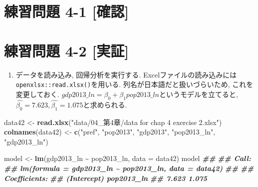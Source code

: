 \documentclass[
]{book}
\newenvironment{Shaded}{\begin{snugshade}}{\end{snugshade}}
\newcommand{\AttributeTok}[1]{\textcolor[rgb]{0.13,0.29,0.53}{#1}}
\newcommand{\DocumentationTok}[1]{\textcolor[rgb]{0.56,0.35,0.01}{\textbf{\textit{#1}}}}
\newcommand{\FunctionTok}[1]{\textcolor[rgb]{0.13,0.29,0.53}{\textbf{#1}}}
\newcommand{\NormalTok}[1]{#1}
\newcommand{\OtherTok}[1]{\textcolor[rgb]{0.56,0.35,0.01}{#1}}
\newcommand{\SpecialCharTok}[1]{\textcolor[rgb]{0.81,0.36,0.00}{\textbf{#1}}}
\newcommand{\StringTok}[1]{\textcolor[rgb]{0.31,0.60,0.02}{#1}}
\providecommand{\tightlist}{%
  \setlength{\itemsep}{0pt}\setlength{\parskip}{0pt}}
\begin{document}
\hypertarget{ux7df4ux7fd2ux554fux984c-4-1-ux78baux8a8d}{%
\section*{練習問題 4-1 {[}確認{]}}\label{ux7df4ux7fd2ux554fux984c-4-1-ux78baux8a8d}}

\hypertarget{ux7df4ux7fd2ux554fux984c-4-2-ux5b9fux8a3c}{%
\section*{練習問題 4-2 {[}実証{]}}\label{ux7df4ux7fd2ux554fux984c-4-2-ux5b9fux8a3c}}

\begin{enumerate}
\def\labelenumi{(\arabic{enumi})}
\tightlist
\item
  データを読み込み, 回帰分析を実行する.
  Excelファイルの読み込みには\texttt{openxlsx::read.xlsx()}を用いる.
  列名が日本語だと扱いづらいため, これを変更しておく.
  \(gdp2013\_ln = \beta_0 + \beta_1 pop2013\_ln\)というモデルを立てると, \(\hat{\beta_0} = 7.623, \hat{\beta_1} = 1.075\)と求められる.
\end{enumerate}

\begin{Shaded}
\begin{Highlighting}[]
\NormalTok{data42 }\OtherTok{\textless{}{-}} \FunctionTok{read.xlsx}\NormalTok{(}\StringTok{"data/04\_第4章/data for chap 4 exercise 2.xlsx"}\NormalTok{)}
\FunctionTok{colnames}\NormalTok{(data42) }\OtherTok{\textless{}{-}} \FunctionTok{c}\NormalTok{(}\StringTok{"pref"}\NormalTok{, }\StringTok{"pop2013"}\NormalTok{, }\StringTok{"gdp2013"}\NormalTok{, }\StringTok{"pop2013\_ln"}\NormalTok{, }\StringTok{"gdp2013\_ln"}\NormalTok{)}

\NormalTok{model }\OtherTok{\textless{}{-}} \FunctionTok{lm}\NormalTok{(gdp2013\_ln }\SpecialCharTok{\textasciitilde{}}\NormalTok{ pop2013\_ln, }\AttributeTok{data =}\NormalTok{ data42)}
\NormalTok{model}
\DocumentationTok{\#\# }
\DocumentationTok{\#\# Call:}
\DocumentationTok{\#\# lm(formula = gdp2013\_ln \textasciitilde{} pop2013\_ln, data = data42)}
\DocumentationTok{\#\# }
\DocumentationTok{\#\# Coefficients:}
\DocumentationTok{\#\# (Intercept)   pop2013\_ln  }
\DocumentationTok{\#\#       7.623        1.075}
\end{Highlighting}
\end{Shaded}
\end{document}
